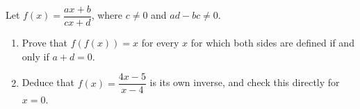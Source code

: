 Let $f(x)=\dfrac{ax+b}{cx+d}$, where $c\ne0$ and $ad-bc\ne0$.
\begin{enumerate}
\item[(a)] Prove that $f(f(x))=x$ for every $x$ for which both sides are defined if and only if $a+d=0$.
\item[(b)] Deduce that $f(x)=\dfrac{4x-5}{x-4}$ is its own inverse, and check this directly for $x=0$.
\end{enumerate}
